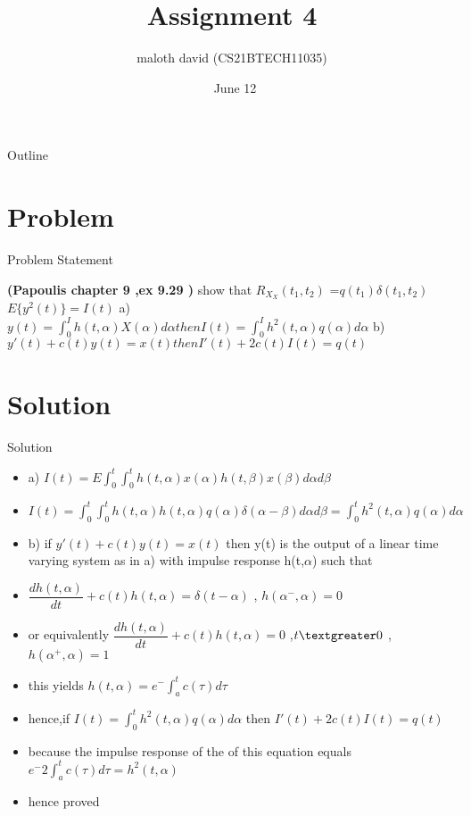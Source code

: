 \documentclass{beamer}
\title{Assignment 4}
\author{maloth david (CS21BTECH11035)}
\date{\ June 12}
\begin{document}
\begin{frame}
    \titlepage 
\end{frame}

\begin{frame}{Outline}
    \tableofcontents
\end{frame}


\section{Problem}
\begin{frame}{Problem Statement}

\textbf{(Papoulis chapter 9 ,ex 9.29 )} show that $R_X_X(t_1,t_2)$ =$q(t_1)\delta(t_1,t_2)$  $E\{y^2(t)\} = I(t)$  a) $y(t) = \int_0^I h(t,\alpha)X(\alpha)d\alpha then I(t)=\int_0^I h^2(t,\alpha)q(\alpha)d\alpha$ b)$y'(t)+c(t)y(t)=x(t) then I'(t)+2c(t)I(t)=q(t)$

\end{frame}


\section{Solution}
\begin{frame}{Solution}

\begin{itemize}

\item a) $I(t) = E{\int_0^t\int_0^t h(t,\alpha)x(\alpha)h(t,\beta)x(\beta)d\alpha d\beta }$

\item $I(t) = \int_0^t\int_0^t h(t,\alpha)h(t,\alpha) q(\alpha)\delta(\alpha -\beta)d\alpha d\beta =\int_0^t h^2(t,\alpha)q(\alpha)d\alpha$

\item b) if $ y'(t)+c(t)y(t)=x(t)$ then y(t) is the output of a linear time varying system as in a) with impulse response h(t,$\alpha$) such that 

\item $\dfrac{dh(t,\alpha)}{dt} + c(t)h(t,\alpha) = \delta(t-\alpha)$ ,  $h(\alpha^-,\alpha)=0$

\item or equivalently
$\dfrac{dh(t,\alpha)}{dt} + c(t)h(t,\alpha) = 0$ ,$ t \textgreater 0$ ,$h(\alpha^+,\alpha)=1$

\item this yields
$h(t,\alpha) = e^-{\int_a^t c(\tau)d\tau}$

\item hence,if
$I(t) = \int_0^t h^2(t,\alpha)q(\alpha)d\alpha$ then $ I'(t)+2c(t)I(t)=q(t)$ 
\item because the impulse response of the of this equation equals
$e^-{2\int_a^tc(\tau)d\tau} = h^2(t,\alpha)$
\item hence proved
\end{itemize}
    
    
\end{frame} 
\end{document}
